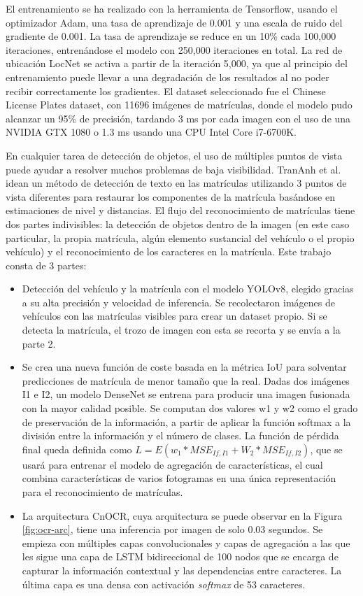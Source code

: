 \documentclass[12pt,a4paper,onecolumn,oneside]{report}
\begin{document}
El entrenamiento se ha realizado con la herramienta de Tensorflow, usando el optimizador Adam, una tasa de aprendizaje de 0.001 y una escala de ruido del gradiente de 0.001. La tasa de aprendizaje se reduce en un 10\% cada 100,000 iteraciones, entrenándose el modelo con 250,000 iteraciones en total. La red de ubicación LocNet se activa a partir de la iteración 5,000, ya que al principio del entrenamiento puede llevar a una degradación de los resultados al no poder recibir correctamente los gradientes. El dataset seleccionado fue el Chinese License Plates dataset, con 11696 imágenes de matrículas, donde el modelo pudo alcanzar un 95\% de precisión, tardando 3 ms por cada imagen con el uso de una NVIDIA GTX 1080 o 1.3 ms usando una CPU Intel Core i7-6700K.



En cualquier tarea de detección de objetos, el uso de múltiples puntos de vista puede ayudar a resolver muchos problemas de baja visibilidad. TranAnh et al. \cite{trananh2023licenseplaterecognitionbased} idean un método de detección de texto en las matrículas utilizando 3 puntos de vista diferentes para restaurar los componentes de la matrícula basándose en estimaciones de nivel y distancias. El flujo del reconocimiento de matrículas tiene dos partes indivisibles: la detección de objetos dentro de la imagen (en este caso particular, la propia matrícula, algún elemento sustancial del vehículo o el propio vehículo) y el reconocimiento de los caracteres en la matrícula. Este trabajo consta de 3 partes:
\begin{itemize}
    \item Detección del vehículo y la matrícula con el modelo YOLOv8, elegido gracias a su alta precisión y velocidad de inferencia. Se recolectaron imágenes de vehículos con las matrículas visibles para crear un dataset propio. Si se detecta la matrícula, el trozo de imagen con esta se recorta y se envía a la parte 2.
    \item Se crea una nueva función de coste basada en la métrica IoU para solventar predicciones de matrícula de menor tamaño que la real. Dadas dos imágenes I1 e I2, un modelo DenseNet se entrena para producir una imagen fusionada con la mayor calidad posible. Se computan dos valores w1 y w2 como el grado de preservación de la información, a partir de aplicar la función softmax a la división entre la información y el número de clases. La función de pérdida final queda definida como $L = E(w_1 * MSE_{If, I1} + W_2 * MSE_{If, I2})$, que se usará para entrenar el modelo de agregación de características, el cual combina características de varios fotogramas en una única representación para el reconocimiento de matrículas.
    \item La arquitectura CnOCR, cuya arquitectura se puede observar en la Figura \ref{fig:ocr-arc}, tiene una inferencia por imagen de solo 0.03 segundos. Se empieza con múltiples capas convolucionales y capas de agregación a las que les sigue una capa de LSTM bidireccional de 100 nodos que se encarga de capturar la información contextual y las dependencias entre caracteres. La última capa es una densa con activación \textit{softmax} de 53 caracteres.
\end{itemize}
\end{document}
